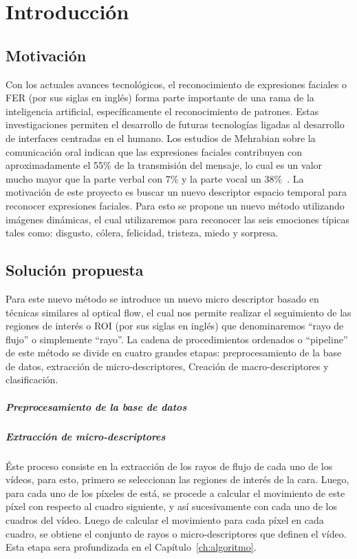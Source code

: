 \chapter[Introducción]{Introducción}
\label{ch:intro}

\section{Motivación}
\label{sec:motivacion}
Con los actuales avances tecnológicos, el reconocimiento de expresiones faciales o FER (por sus siglas en inglés) forma parte importante de una rama de la inteligencia artificial, específicamente el reconocimiento de patrones.  Estas investigaciones permiten el desarrollo de futuras tecnologías ligadas al desarrollo de interfaces centradas en el humano. 
Los estudios de Mehrabian sobre la comunicación oral indican que las expresiones faciales contribuyen con aproximadamente el 55\% de la transmisión del mensaje, lo cual es un valor mucho mayor que la parte verbal con 7\% y la parte vocal un 38\%~\cite{MEHRABIANA}.
La motivación de este proyecto es buscar un nuevo descriptor espacio temporal para reconocer expresiones faciales. Para esto se propone un nuevo método utilizando imágenes dinámicas, el cual utilizaremos para reconocer las seis emociones típicas tales como: disgusto, cólera, felicidad, tristeza, miedo y sorpresa.

\section{Solución propuesta}
\label{sec:solucion}

Para este nuevo método se introduce un nuevo micro descriptor basado en técnicas similares al optical flow, el cual nos permite realizar el seguimiento de las regiones de interés o ROI (por sus siglas en inglés) que denominaremos ``rayo de flujo'' o simplemente ``rayo''.
La cadena de procedimientos ordenados o ``pipeline'' de este método se divide en cuatro grandes
etapas: preprocesamiento de la base de datos, extracción de micro-descriptores, Creación de macro-descriptores y clasificación.

\paragraph{Preprocesamiento de la base de datos}
\label{ch1:par:preprocesamientobdd}

\paragraph{Extracción de micro-descriptores}
\label{ch1:par:microdescriptores}
Éste proceso consiste en la extracción de los rayos de flujo de cada uno de los vídeos, para esto, primero se seleccionan las regiones de interés de la cara. Luego, para cada uno de los píxeles de está, se procede a calcular el movimiento de este píxel con respecto al cuadro siguiente, y así sucesivamente con cada uno de los cuadros del vídeo. Luego de calcular el movimiento para cada píxel en cada cuadro, se obtiene el conjunto de rayos o micro-descriptores que definen el vídeo. Esta etapa sera profundizada en el Capítulo~\ref{ch:algoritmo}.

